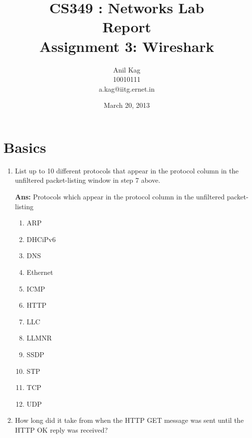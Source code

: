 \documentclass[a4,11pt]{article}
\newenvironment{que}
{ \color{ForestGreen}
  \begin{question}
}
{ \end{question} }
\newenvironment{sol}
{ \color{Black}
  \begin{solution}
}
{ \end{solution} }
\begin{document}
\title{CS349 : Networks Lab \\
	Report\\
	Assignment 3: Wireshark}
\author{Anil Kag\\
	   10010111\\
	   a.kag@iitg.ernet.in}
\date{March 20, 2013}
\maketitle


\section{Basics}
	  
\begin{enumerate}
 \item
  \begin{que}
    List up to 10 different protocols that appear in the protocol column in the unfiltered packet-listing window in step 7 above. 
  \end{que}
   
  \begin{sol}
   \textbf{Ans:} Protocols which appear in the protocol column in the unfiltered packet-listing
      \begin{multicols}{3}
	\begin{enumerate}
	\item ARP  	\item DHCiPv6
	\item DNS 	\item Ethernet 
	\item ICMP      	\item HTTP
	\item LLC        \item LLMNR
	\item SSDP       \item STP 
	\item TCP       	\item UDP
	\end{enumerate}
      \end{multicols}
    \end{sol}
    
    
    \item
    \begin{que} 
      How long did it take from when the HTTP GET message was sent until the HTTP OK reply was received? 
    \end{que}


\end{enumerate}
\end{document}

